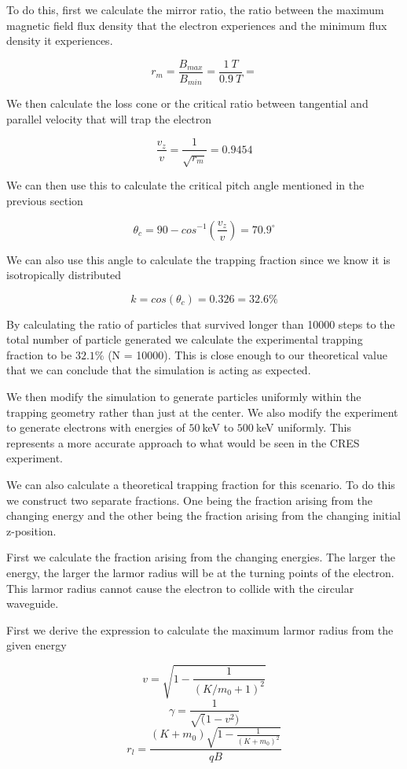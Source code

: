 \documentclass[12pt,letterpaper]{article}
\begin{document}
To do this, first we calculate the mirror ratio, the ratio between the maximum magnetic field flux density that the electron experiences and the minimum flux density it experiences.

\[ r_m =  \frac{B_{max}}{B_{min}} = \frac{1~T}{0.9~T} = \]

We then calculate the loss cone or the critical ratio between tangential and parallel velocity that will trap the electron

\[ \frac{v_z}{v} = \frac{1}{\sqrt{r_m}} = 0.9454 \]

We can then use this to calculate the critical pitch angle mentioned in the previous section

\[ \theta_c = 90 - cos^{-1}(\frac{v_z}{v}) = 70.9^\circ \]

We can also use this angle to calculate the trapping fraction since we know it is isotropically distributed

\[ k = cos(\theta_c) = 0.326 = 32.6\% \]

By calculating the ratio of particles that survived longer than 10000 steps to the total number of particle generated we calculate the experimental trapping fraction to be $32.1$\% (N = 10000). This is close enough to our theoretical value that we can conclude that the simulation is acting as expected.

We then modify the simulation to generate particles uniformly within the trapping geometry rather than just at the center. We also modify the experiment to generate electrons with energies of $50~$keV to $500~$keV uniformly. This represents a more accurate approach to what would be seen in the CRES experiment. 

We can also calculate a theoretical trapping fraction for this scenario. To do this we construct two separate fractions. One being the fraction arising from the changing energy and the other being the fraction arising from the changing initial z-position.

First we calculate the fraction arising from the changing energies. The larger the energy, the larger the larmor radius will be at the turning points of the electron. This larmor radius cannot cause the electron to collide with the circular waveguide. 

First we derive the expression to calculate the maximum larmor radius from the given energy

\[ v = \sqrt{1 - \frac{1}{(K/m_0 + 1)^2}} \]
\[ \gamma = \frac{1}{\sqrt(1 - v^2)} \]
\[ r_l = \frac{(K + m_0)\sqrt{1 - \frac{1}{(K + m_0)^2}}}{qB} \]
\end{document}
